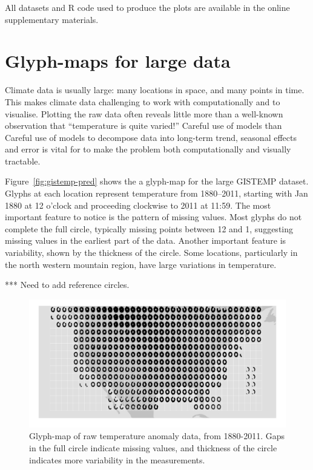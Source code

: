 \documentclass[oneside]{article}
\begin{document}
All datasets and R code used to produce the plots are available in the online supplementary materials.

\section{Glyph-maps for large data}
\label{sec:large-data}

Climate data is usually large: many locations in space, and many points in time. This makes climate data challenging to work with computationally and to visualise. Plotting the raw data often reveals little more than a well-known observation that ``temperature is quite varied!'' Careful use of models than Careful use of models to decompose data into long-term trend, seasonal effects and error is vital for to make the problem both computationally and visually tractable.

Figure~\ref{fig:gistemp-pred} shows the a glyph-map for the large GISTEMP dataset. Glyphs at each location represent temperature from 1880--2011, starting with Jan 1880 at 12 o'clock and proceeding clockwise to 2011 at 11:59. The most important feature to notice is the pattern of missing values. Most glyphs do not complete the full circle, typically missing points between 12 and 1, suggesting missing values in the earliest part of the data. Another important feature is variability, shown by the thickness of the circle. Some locations, particularly in the north western mountain region, have large variations in temperature. 

*** Need to add reference circles.

\begin{figure}[htbp]
  \centering

  \includegraphics[width=1\linewidth]{gistemp-polar-raw}

  \caption{Glyph-map of raw temperature anomaly data, from 1880-2011. Gaps in the full circle indicate missing values, and thickness of the circle indicates more variability in the measurements.}
  \label{fig:gistemp-raw}
\end{figure}
\end{document}
